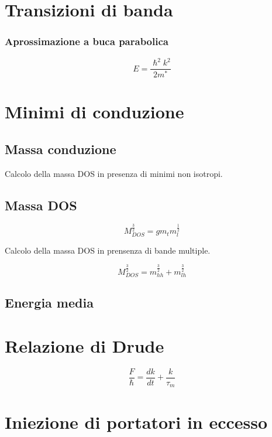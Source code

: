 \documentclass[10pt,a4paper]{report}
\begin{document}
\chapter{Transizioni di banda}

 	\subsection{Aprossimazione a buca parabolica}

 	\[
 	E=\frac{\hslash^2 k^2}{2 m^*}
 	\]

\chapter{Minimi di conduzione}

	\section{Massa conduzione}

	Calcolo della massa DOS in presenza di minimi non isotropi.

	\section{Massa DOS}
	\begin{equation}
	M_{DOS}^{\frac{3}{2}}=gm_t m_l^{\frac{1}{2}}
	\end{equation}

	Calcolo della massa DOS in prensenza di bande multiple.

	\begin{equation}
	M_{DOS}^{\frac{3}{2}} = m_{hh}^{\frac{3}{2}}+m_{lh}^{\frac{3}{2}}
	\end{equation}
	
	\section{Energia media}

\chapter{Relazione di Drude}

\[
\frac{\textit{F}}{\hslash}=\frac{dk}{dt}+\frac{k}{\tau_m}
\]

\chapter{Iniezione di portatori in eccesso}
\end{document}
